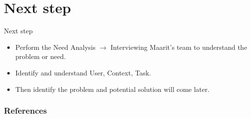 \documentclass{beamer}
\begin{document}
\section{Next step}
\begin{frame}{Next step}
\begin{itemize}
    \item Perform the Need Analysis $\rightarrow$ Interviewing Maarit's team to understand the problem or need.
    \item Identify and understand User, Context, Task.
    \item Then identify the problem and potential solution will come later.
\end{itemize}
\end{frame}


\begin{frame}[t, allowframebreaks]
\frametitle{References}


\end{frame}









\end{document}

